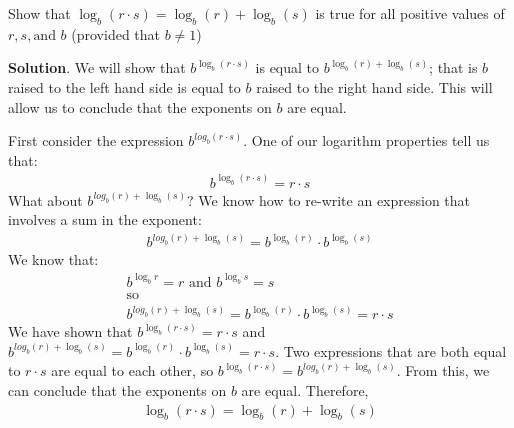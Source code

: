 \documentclass[10pt,]{book}
\theoremstyle{ptxdefinitionnotitle}
\theoremstyle{ptxdefinitiontitle}
\theoremstyle{ptxdefinitionnotitle}
\theoremstyle{ptxdefinitiontitle}
\theoremstyle{ptxdefinitionnotitle}
\theoremstyle{ptxdefinitiontitle}
\numberwithin{equation}{section}
\begin{document}
\begin{example}\label{example-21}
\hypertarget{p-289}{}%
Show that \(\log_b \left( r \cdot s \right) = \log_b \left( r \right) + \log_b \left( s \right) \) is true for all positive values of \(r, s, \text{and } b\) (provided that \(b \neq 1\))%
\par\smallskip%
\noindent\textbf{Solution}.\hypertarget{solution-21}{}\quad%
\hypertarget{p-290}{}%
We will show that \(b^{\log_b\left( r \cdot s \right)}\) is equal to \(b^{ \log_b\left( r \right) + \log_b\left( s \right)}\); that is \(b\) raised to the left hand side is equal to \(b\) raised to the right hand side. This will allow us to conclude that the exponents on \(b\) are equal.%
\par
\hypertarget{p-291}{}%
First consider the expression \(b^{log_b \left( r \cdot s \right)}\). One of our logarithm properties tell us that:%
\begin{gather*}
b^{\log_b \left( r \cdot s \right)} = r \cdot s
\end{gather*}
What about \(b^{log_b \left( r \right) + \log_b \left( s \right)}\)? We know how to re-write an expression that involves a sum in the exponent:%
\begin{gather*}
b^{log_b \left( r \right) + \log_b \left( s \right)} = b^{ \log_b\left( r \right)} \cdot  b^{\log_b\left( s \right)}
\end{gather*}
We know that:%
\begin{gather*}
b^{\log_b r} = r \text{  and  } b^{\log_b s} = s\\
\text{so}\\
b^{log_b \left( r \right) + \log_b \left( s \right)} = b^{ \log_b\left( r \right)} \cdot  b^{\log_b\left( s \right)} = r \cdot s
\end{gather*}
We have shown that \(b^{\log_b \left( r \cdot s \right)} = r \cdot s\) and \(b^{log_b \left( r \right) + \log_b \left( s \right)} = b^{ \log_b\left( r \right)} \cdot  b^{\log_b\left( s \right)} = r \cdot s\). Two expressions that are both equal to \(r \cdot s\) are equal to each other, so \(b^{\log_b \left( r \cdot s \right)} = b^{log_b \left( r \right) + \log_b \left( s \right)}\). From this, we can conclude that the exponents on \(b\) are equal. Therefore,%
\begin{gather*}
\log_b \left( r \cdot s \right) = \log_b \left( r \right) + \log_b \left( s \right)
\end{gather*}
%
\end{example}
\end{document}

